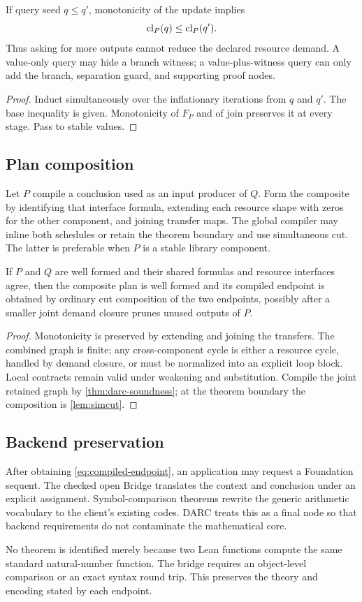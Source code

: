 If query seed \(q\le q'\), monotonicity of the update implies
\[
  \operatorname{cl}_P(q)\le\operatorname{cl}_P(q').
\]
Thus asking for more outputs cannot reduce the declared resource demand.  A
value-only query may hide a branch witness; a value-plus-witness query can only
add the branch, separation guard, and supporting proof nodes.

\begin{proof}
Induct simultaneously over the inflationary iterations from \(q\) and \(q'\).
The base inequality is given.  Monotonicity of \(F_P\) and of join preserves it
at every stage.  Pass to stable values.
\end{proof}

\subsection{Plan composition}

Let \(P\) compile a conclusion used as an input producer of \(Q\).  Form the
composite by identifying that interface formula, extending each resource shape
with zeros for the other component, and joining transfer maps.  The global
compiler may inline both schedules or retain the theorem boundary and use
simultaneous cut.  The latter is preferable when \(P\) is a stable library
component.

\begin{proposition}
If \(P\) and \(Q\) are well formed and their shared formulas and resource
interfaces agree, then the composite plan is well formed and its compiled
endpoint is obtained by ordinary cut composition of the two endpoints,
possibly after a smaller joint demand closure prunes unused outputs of \(P\).
\end{proposition}

\begin{proof}
Monotonicity is preserved by extending and joining the transfers.  The
combined graph is finite; any cross-component cycle is either a resource cycle,
handled by demand closure, or must be normalized into an explicit loop block.
Local contracts remain valid under weakening and substitution.  Compile the
joint retained graph by \cref{thm:darc-soundness}; at the theorem boundary the
composition is \cref{lem:simcut}.
\end{proof}

\subsection{Backend preservation}

After obtaining \eqref{eq:compiled-endpoint}, an application may request a
Foundation sequent.  The checked open Bridge translates the context and
conclusion under an explicit assignment.  Symbol-comparison theorems rewrite
the generic arithmetic vocabulary to the client's existing codes.  DARC treats
this as a final node so that backend requirements do not contaminate the
mathematical core.

No theorem is identified merely because two Lean functions compute the same
standard natural-number function.  The bridge requires an object-level
comparison or an exact syntax round trip.  This preserves the theory and
encoding stated by each endpoint.
